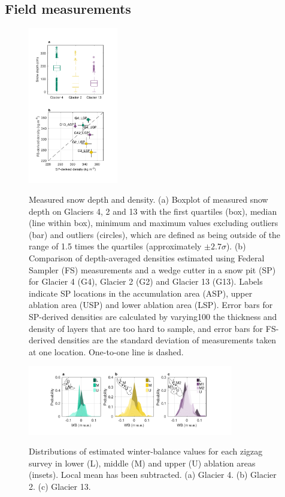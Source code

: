 \documentclass[twocolumn, letterpaper]{igs}
\begin{document}
\subsection{Field measurements}

\begin{figure}
	\centering
	\includegraphics[width =0.35\textwidth]{DepthBoxplot_SPvsFS.pdf}\\
	\caption{Measured snow depth and density. (a) Boxplot of measured snow depth on Glaciers 4, 2 and 13 with the first quartiles (box), median (line within box), minimum and maximum values excluding outliers (bar) and outliers (circles), which are defined as being outside of the range of 1.5 times the quartiles (approximately $\pm2.7\sigma$). (b) Comparison of depth-averaged densities estimated using Federal Sampler (FS) measurements and  a wedge cutter in a snow pit (SP)  for Glacier 4 (G4), Glacier 2 (G2) and Glacier 13 (G13). Labels indicate SP locations in the accumulation area (ASP), upper ablation area (USP) and lower ablation area (LSP). Error bars for SP-derived densities are calculated by varying100 the thickness and density of layers that are too hard to sample, and error bars for FS-derived densities are the standard deviation of measurements taken at one location. One-to-one line is dashed.}
	\label{fig:DepthBoxplot_SPvsFS}
\end{figure}

\begin{figure}
	\centering
	\includegraphics[width =0.8\textwidth]{ZigzagHistogram.pdf}\\
	\caption{Distributions of estimated winter-balance values for each zigzag survey in lower (L), middle (M) and upper (U) ablation areas (insets). Local mean has been subtracted. (a) Glacier 4. (b) Glacier 2. (c) Glacier 13.}
	\label{fig:ZigzagHistogram}
\end{figure}
\end{document}
